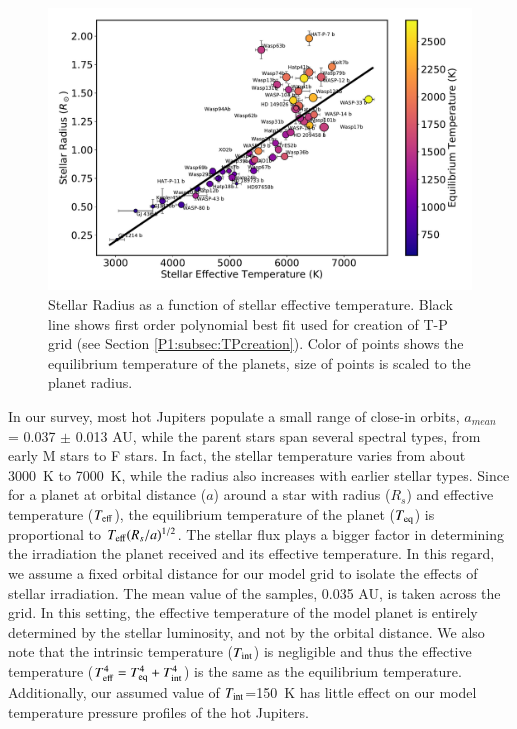 \begin{figure}
    \centering
    \includegraphics[width=\linewidth]{RsTs.pdf}
    \caption{Stellar Radius as a function of stellar effective temperature. Black line shows first order polynomial best fit used for creation of T-P grid (see Section \ref{P1:subsec:TPcreation}). Color of points shows the equilibrium temperature of the planets, size of points is scaled to the planet radius.}
    \label{P1:fig:RsTs}
\end{figure}

In our survey, most hot Jupiters populate a small range of close-in orbits, $a_{mean}$ = 0.037 $\pm$ 0.013 AU, while the parent stars span several spectral types, from early M stars to F stars. In fact, the stellar temperature varies from about 3000~K to 7000~K, while the radius also increases with earlier stellar types. Since for a planet at orbital distance ($a$) around a star with radius ($R_s$) and effective temperature ($T_{\rm eff}$), the equilibrium temperature of the planet ($T_{\rm eq}$) is proportional to $T_{\rm eff} (R_s/a)^{1/2}$. The stellar flux plays a bigger factor in determining the irradiation the planet received and its effective temperature. In this regard, we assume a fixed orbital distance for our model grid to isolate the effects of stellar irradiation. The mean value of the samples, 0.035 AU, is taken across the grid. In this setting, the effective temperature of the model planet is entirely determined by the stellar luminosity, and not by the orbital distance. We also note that the intrinsic temperature ($T_{\rm int}$) is negligible and thus the effective temperature ($T_{\rm eff}^4 = T_{\rm eq}^4 + T_{\rm int}^4$) is the same as the equilibrium temperature. Additionally, our assumed value of $T_{\rm int}$=150~K has little effect on our model temperature pressure profiles of the hot Jupiters.

